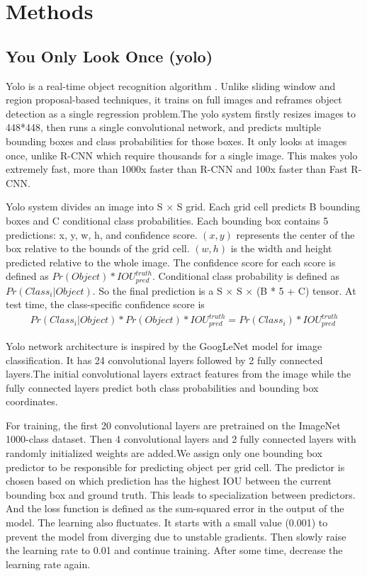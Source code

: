 \section{Methods}

\subsection{You Only Look Once (yolo)}
Yolo is a real-time object recognition algorithm \cite{yolo}. Unlike sliding window and region proposal-based techniques, it trains on full images and reframes object detection as a single regression problem.The yolo system firstly resizes images to 448*448, then runs a single convolutional network, and predicts multiple bounding boxes and class probabilities for those boxes. It only looks at images once, unlike R-CNN which require thousands for a single image. This makes yolo extremely fast, more than 1000x faster than R-CNN and 100x faster than Fast R-CNN. 


Yolo system divides an image into S × S grid. Each grid cell predicts B bounding boxes and C conditional class probabilities. Each bounding box contains 5 predictions: x, y, w, h, and confidence score. $(x, y)$ represents the center of the box relative to the bounds of the grid cell. $(w, h)$ is the width and height predicted relative to the whole image. The confidence score for each score is defined as $Pr(Object) * IOU_{pred}^{truth}$. Conditional class probability is defined as $Pr({Class_{i}}|Object)$. So the final prediction is a S × S × (B * 5 + C) tensor. At test time, the class-specific confidence score is 
\begin{align}
Pr({Class_{i}}|Object) * Pr(Object) * IOU_{pred}^{truth} = Pr({Class_{i}}) * IOU_{pred}^{truth}
\end{align}

Yolo network architecture is inspired by the GoogLeNet model for image classification. It has 24 convolutional layers followed by 2 fully connected layers.The initial convolutional layers extract features from the image while the fully connected layers predict both class probabilities and bounding box coordinates.

For training, the first 20 convolutional layers are pretrained on the ImageNet 1000-class dataset. Then 4 convolutional layers and 2 fully connected layers with randomly initialized weights are added.We assign only one bounding box predictor to be responsible for predicting object per grid cell. The predictor is chosen based on which prediction has the highest IOU between the current bounding box and ground truth. This leads to specialization between predictors. And the loss function is defined as the sum-squared error in the output of the model. The learning also fluctuates. It starts with a small value (0.001) to prevent the model from diverging due to unstable gradients. Then slowly raise the learning rate to 0.01 and continue training. After some time, decrease the learning rate again.

